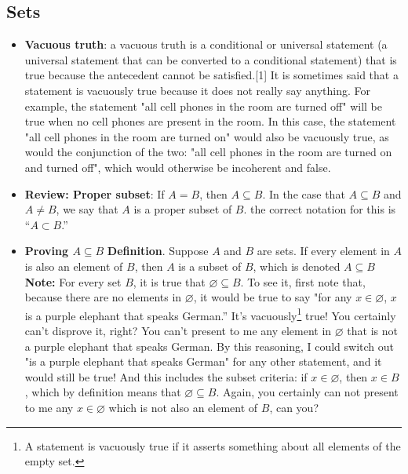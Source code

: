 \documentclass{report}
\begin{document}
    \pagebreak 
    \subsection{Sets}
    \begin{itemize}
        \item \textbf{Vacuous truth}: a vacuous truth is a conditional or universal statement (a universal statement that can be converted to a conditional statement) that is true because the antecedent cannot be satisfied.[1] It is sometimes said that a statement is vacuously true because it does not really say anything. For example, the statement "all cell phones in the room are turned off" will be true when no cell phones are present in the room. In this case, the statement "all cell phones in the room are turned on" would also be vacuously true, as would the conjunction of the two: "all cell phones in the room are turned on and turned off", which would otherwise be incoherent and false.
        \item \textbf{Review: Proper subset}: If $A = B$, then $A \subseteq B$. In the case that $A \subseteq B$ and $A \ne B$, we say that $A$ is a proper subset of $B$. the correct notation for this is “$A \subset B$.”
        \item \textbf{Proving $A \subseteq B $}
            \bigbreak \noindent 
            \textbf{Definition}. Suppose $A$ and $B$ are sets. If every element in $A$ is also an element of $B$, then $A$ is a subset of $B $, which is denoted $A \subseteq B$
            \bigbreak \noindent 
            \textbf{Note:} For every set $B$, it is true that $\varnothing \subseteq B $. 
            To see it, first note that, because there are no elements in $\varnothing$, it would be true to say  
            "for any $x \in \varnothing$, $x$ is a purple elephant that speaks German.'' It’s vacuously\footnote{A statement is vacuously true if it asserts something about all elements of the empty set.} true!  
            You certainly can’t disprove it, right? You can’t present to me any element in $\varnothing$ that is not a purple elephant that speaks German.
            \bigbreak \noindent 
            By this reasoning, I could switch out "is a purple elephant that speaks German" for any other statement, and it would still be true! And this includes the subset criteria: if $x \in \varnothing$, then $x \in B$, which by definition means that $\varnothing \subseteq B$.  
            Again, you certainly can not present to me any $x \in \varnothing$ which is not also an element of $B$, can you?

\end{itemize}
\end{document}
